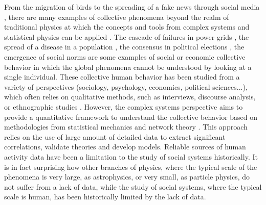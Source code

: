 From the migration of birds \cite{roche-1997} to the spreading of a fake news through social media \cite{vosoughi-2018}, there are many examples of collective phenomena beyond the realm of traditional physics at which the concepts and tools from complex systems and statistical physics can be applied \cite{perc2013evolutionary}. The cascade of failures in power grids \cite{dobson-2007}, the spread of a disease in a population \cite{anderson1991infectious}, the consensus in political elections \cite{anderson-2000}, the emergence of social norms \cite{ellickson-1999} are some examples of social or economic collective behavior in which the global phenomena cannot be understood by looking at a single individual. These collective human behavior has been studied from a variety of perspectives (sociology, psychology, economics, political sciences...), which often relies on qualitative methods, such as interviews, discourse analysis, or ethnographic studies \cite{bryman-2010}. However, the complex systems perspective aims to provide a quantitative framework to understand the collective behavior based on methodologies from statistical mechanics and network theory \cite{newman-book,barabasi-2013}. This approach relies on the use of large amount of detailed data to extract significant correlations, validate theories and develop models. Reliable sources of human activity data have been a limitation to the study of social systems historically. It is in fact surprising how other branches of physics, where the typical scale of the phenomena is very large, as astrophysics, or very small, as particle physics, do not suffer from a lack of data, while the study of social systems, where the typical scale is human, has been historically limited by the lack of data.

